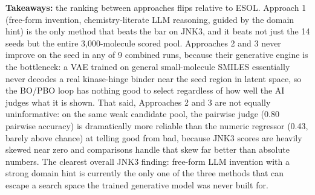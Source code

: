 \documentclass[11pt,a4paper]{article}
\begin{document}
\textbf{Takeaways:} the ranking between approaches flips relative to ESOL. Approach 1 (free-form invention, chemistry-literate LLM reasoning, guided by the domain hint) is the only method that beats the bar on JNK3, and it beats not just the 14 seeds but the entire 3{,}000-molecule scored pool. Approaches 2 and 3 never improve on the seed in any of 9 combined runs, because their generative engine is the bottleneck: a VAE trained on general small-molecule SMILES essentially never decodes a real kinase-hinge binder near the seed region in latent space, so the BO/PBO loop has nothing good to select regardless of how well the AI judges what it is shown. That said, Approaches 2 and 3 are not equally uninformative: on the same weak candidate pool, the pairwise judge (0.80 pairwise accuracy) is dramatically more reliable than the numeric regressor (0.43, barely above chance) at telling good from bad, because JNK3 scores are heavily skewed near zero and comparisons handle that skew far better than absolute numbers. The clearest overall JNK3 finding: free-form LLM invention with a strong domain hint is currently the only one of the three methods that can escape a search space the trained generative model was never built for.
\end{document}
